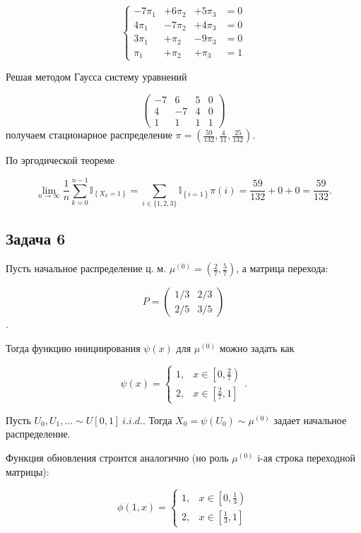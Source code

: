 \documentclass[a4paper,12pt]{article} %
\begin{document}
$$\left\{\begin{array}{cccc}
-7 \pi_{1}&+6 \pi_{2}&+5 \pi_{3}&=0\\
4 \pi_{1}&-7 \pi_{2}&+4 \pi_{3}&=0 \\
3 \pi_{1}&+\pi_{2}&-9 \pi_{3}&=0\\
\pi_{1}&+\pi_{2}&+\pi_{3}&=1
\end{array}\right.$$

Решая методом Гаусса систему уравнений


$$\left(\begin{array}{ccc|c}
-7 & 6 & 5 & 0 \\
4 & -7 & 4 & 0 \\
1 & 1 & 1 & 1
\end{array}\right)$$  
получаем стационарное 
распределение   
$\pi=\left(\frac{59}{132}, 
\frac{4}{11},
\frac{25}{132}
\right)$.

По эргодической теореме 

$$ 
\lim_{n \to \infty }\frac{1}{n} \sum_{k=0}^{n-1} \mathbb{I}_{\left\{X_{k} = 1 \right\}} =  \sum_{i\in {\{1,2,3\} } } \mathbb{I}_{\left\{i = 1 \right\}} \pi(i)  =   \dfrac{59}{132} + 0 + 0 =  \dfrac{59}{132}. $$

  
\subsection*{Задача 6}

Пусть начальное распределение ц. м. 
$\mu^{(0)}=\left(\frac{2}{7}, \frac{5}{7}\right)$, а матрица перехода: 

$$P=\left(\begin{array}{ll}
1 / 3 & 2 / 3 \\
2 / 5 & 3 / 5
\end{array}\right)$$. 

Тогда функцию инициирования $\psi(x)$ для $\mu^{(0)}$  можно задать как 

$$\psi(x)=\left\{\begin{array}{ll}
1, & x \in\left[0, \frac{2}{7}\right) \\
2, & x \in\left[\frac{2}{7}, 1\right]
\end{array}\right.. $$

Пусть $U_{0}, U_{1}, \ldots \sim  U[0,1] \ i.i.d.$. 
Тогда  $X_{0}=\psi\left(U_{0}\right) \sim \mu^{(0)}$ задает начальное распределение. 

Функция обновления строится аналогично (но роль  $\mu^{(0)}$ i-ая строка переходной матрицы): 

$$\phi(1, x)=\left\{\begin{array}{ll}
1, & x \in\left[0, \frac{1}{3}\right) \\
2, & x \in\left[\frac{1}{3}, 1\right]
\end{array}\right.$$
 
\end{document}
